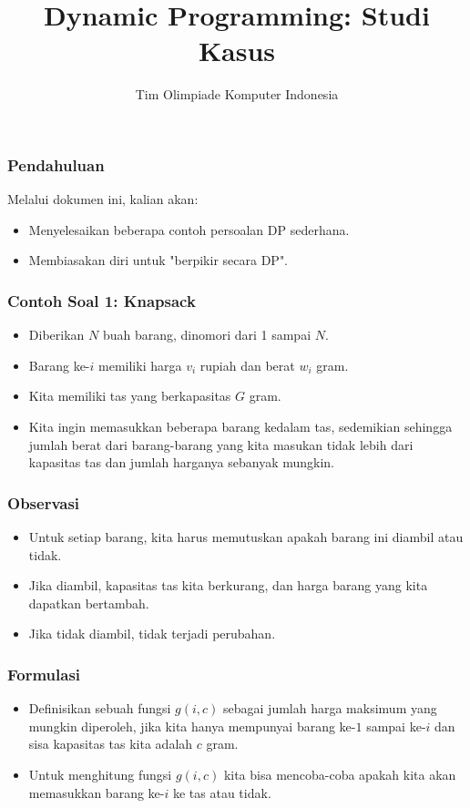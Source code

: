 

\title{Dynamic Programming: \newline Studi Kasus}
\author{Tim Olimpiade Komputer Indonesia}
\date{}

\usepackage{qtree}


\begin{frame}
\titlepage
\end{frame}

\begin{frame}
\frametitle{Pendahuluan}
Melalui dokumen ini, kalian akan:
\begin{itemize}
  \item Menyelesaikan beberapa contoh persoalan DP sederhana.
  \item Membiasakan diri untuk "berpikir secara DP".
\end{itemize}
\end{frame}

\begin{frame} 
\frametitle{Contoh Soal 1: Knapsack}
\begin{itemize}
  \item Diberikan $N$ buah barang, dinomori dari 1 sampai $N$. 
  \item Barang ke-$i$ memiliki harga $v_i$ rupiah dan berat $w_i$ gram. 
  \item Kita memiliki tas yang berkapasitas $G$ gram. 
  \item Kita ingin memasukkan beberapa barang kedalam tas, sedemikian sehingga jumlah berat dari barang-barang yang kita masukan tidak lebih dari kapasitas tas dan jumlah harganya sebanyak mungkin.
\end{itemize}
\end{frame}

\begin{frame} 
\frametitle{Observasi}
\begin{itemize}
  \item Untuk setiap barang, kita harus memutuskan apakah barang ini diambil atau tidak.
  \item Jika diambil, kapasitas tas kita berkurang, dan harga barang yang kita dapatkan bertambah.
  \item Jika tidak diambil, tidak terjadi perubahan.
\end{itemize}
\end{frame}

\begin{frame} 
\frametitle{Formulasi}
\begin{itemize}
  \item Definisikan sebuah fungsi $g(i,c)$ sebagai jumlah harga maksimum yang mungkin diperoleh, jika kita hanya mempunyai barang ke-$1$ sampai ke-$i$ dan sisa kapasitas tas kita adalah $c$ gram.
  \item Untuk menghitung fungsi $g(i,c)$ kita bisa mencoba-coba apakah kita akan memasukkan barang ke-$i$ ke tas atau tidak.
\end{itemize}
\end{frame}


